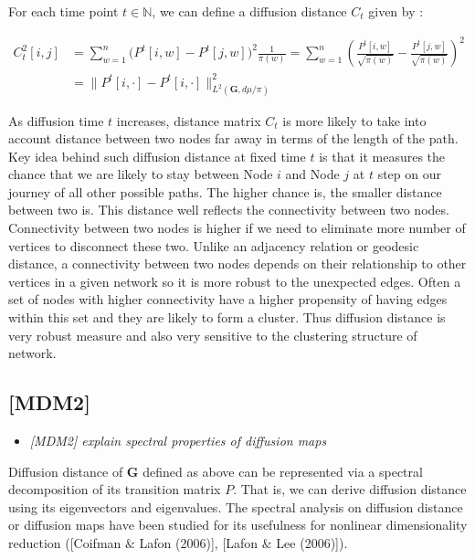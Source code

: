 \documentclass[12pt]{article}
\theoremstyle{definition}
\begin{document}
For each time point $t \in \mathbb{N}$, we can define a diffusion distance $C_{t}$  given by :

\begin{equation}
\begin{split}
C^2_{t}[i,j] & = \sum\limits_{w =1}^{n} \big( P^{t}[i,w] - P^{t}[j,w]  \big)^{2} \frac{1}{\pi(w)} = \sum\limits_{w=1}^{n} \left(  \frac{P^{t}[i,w]}{\sqrt{\pi(w)}} - \frac{P^{t}[j,w]}{\sqrt{\pi(w)}}   \right)^2 \\ & = \parallel P^{t}[i, \cdot] - P^{t}[i, \cdot]  \parallel^2_{L^{2}(\boldsymbol{G}, d\mu / \pi)  }
\end{split}
\end{equation}

As diffusion time $t$ increases, distance matrix $C_{t}$ is more likely to take into account distance between two nodes far away in terms of the length of the path. Key idea behind such diffusion distance at fixed time $t$ is that it measures the chance that we are likely to stay between Node $i$ and Node $j$ at $t$ step on our journey of all other possible paths. The higher chance is, the smaller distance between two is. This distance well reflects the connectivity between two nodes. Connectivity between two nodes is higher if we need to eliminate more number of vertices to disconnect these two. Unlike an adjacency relation or geodesic distance, a connectivity between two nodes depends on their relationship to other vertices in a given network so it is more robust to the unexpected edges. Often a set of nodes with higher connectivity have a higher propensity of having edges within this set and they are likely to form a cluster. Thus diffusion distance is very robust measure and also very sensitive to the clustering structure of network. 



\subsection{[MDM2]}
\begin{itemize}
	\item {\it  [MDM2] explain spectral properties of diffusion maps \/}
\end{itemize}


Diffusion distance of $\boldsymbol{G}$ defined as above can be represented via a spectral decomposition of its transition matrix $P$. That is, we can derive diffusion distance using its eigenvectors and eigenvalues. The spectral analysis on diffusion distance or diffusion maps have been studied for its usefulness for nonlinear dimensionality reduction ([Coifman $\&$ Lafon (2006)], [Lafon $\&$ Lee (2006)]). 
 
\end{document}
